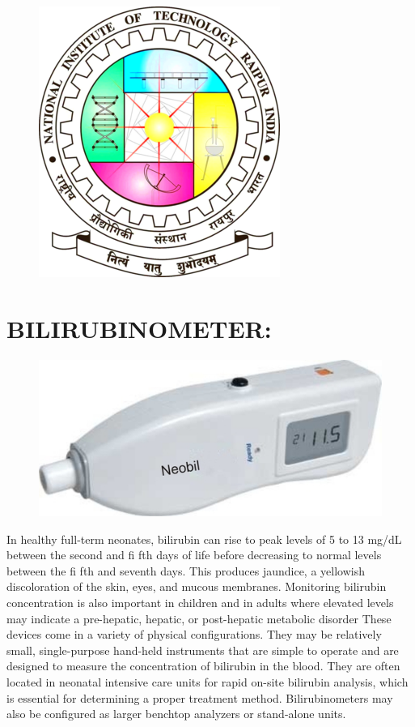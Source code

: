 \documentclass[a4paper,12pt]{article}
\author{Raj Motwani \\ Roll no- 21111042}
\begin{document}
\begin{figure}
\centering
\includegraphics[scale=0.6]{nitlogo.png}
\end{figure}
\maketitle

\clearpage


\large
\section{BILIRUBINOMETER:} 
\begin{figure}[h]

\includegraphics[scale=1.5]{bil.jpg}
\end{figure}  
 
 In healthy full-term neonates, bilirubin can rise to peak levels of
5 to 13 mg/dL between the second and fi fth days of life before
decreasing to normal levels between the fi fth and seventh days.
This produces jaundice, a yellowish discoloration of the skin, eyes,
and mucous membranes. Monitoring bilirubin concentration is
also important in children and in adults where elevated levels
may indicate a pre-hepatic, hepatic, or post-hepatic metabolic
disorder
 These devices come in a variety of physical configurations. They may be relatively small, single-purpose hand-held instruments that are simple to operate and are designed to measure the concentration of bilirubin in the blood. They are often located in neonatal intensive care units for rapid on-site bilirubin analysis, which is essential for determining a proper treatment method. Bilirubinometers may also be configured as larger benchtop analyzers or stand-alone units.
 
\end{document}
